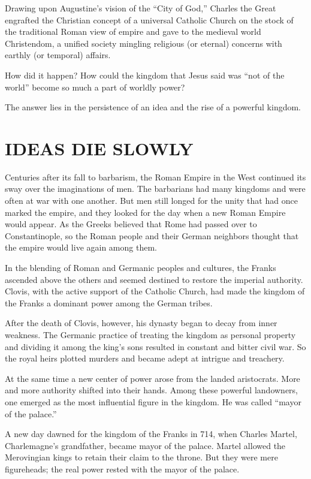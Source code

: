 Drawing upon Augustine’s vision of the “City of God,” Charles the Great engrafted the Christian
concept of a universal Catholic Church on the stock of the traditional Roman view of empire and gave
to the medieval world Christendom, a unified society mingling religious (or eternal) concerns with
earthly (or temporal) affairs.

How did it happen? How could the kingdom that Jesus said was “not of the world” become so much a
part of worldly power?

The answer lies in the persistence of an idea and the rise of a powerful kingdom.

\section{IDEAS DIE SLOWLY}

Centuries after its fall to barbarism, the Roman Empire in the West continued its sway over the
imaginations of men. The barbarians had many kingdoms and were often at war with one another. But
men still longed for the unity that had once marked the empire, and they looked for the day when a
new Roman Empire would appear. As the Greeks believed that Rome had passed over to Constantinople,
so the Roman people and their German neighbors thought that the empire would live again among them.

In the blending of Roman and Germanic peoples and cultures, the Franks ascended above the others and
seemed destined to restore the imperial authority. Clovis, with the active support of the Catholic
Church, had made the kingdom of the Franks a dominant power among the German tribes.

After the death of Clovis, however, his dynasty began to decay from inner weakness. The Germanic
practice of treating the kingdom as personal property and dividing it among the king’s sons resulted
in constant and bitter civil war. So the royal heirs plotted murders and became adept at intrigue
and treachery.

At the same time a new center of power arose from the landed aristocrats. More and more authority
shifted into their hands. Among these powerful landowners, one emerged as the most influential
figure in the kingdom. He was called “mayor of the palace.”

A new day dawned for the kingdom of the Franks in 714, when Charles Martel, Charlemagne’s
grandfather, became mayor of the palace. Martel allowed the Merovingian kings to retain their claim
to the throne. But they were mere figureheads; the real power rested with the mayor of the palace.

